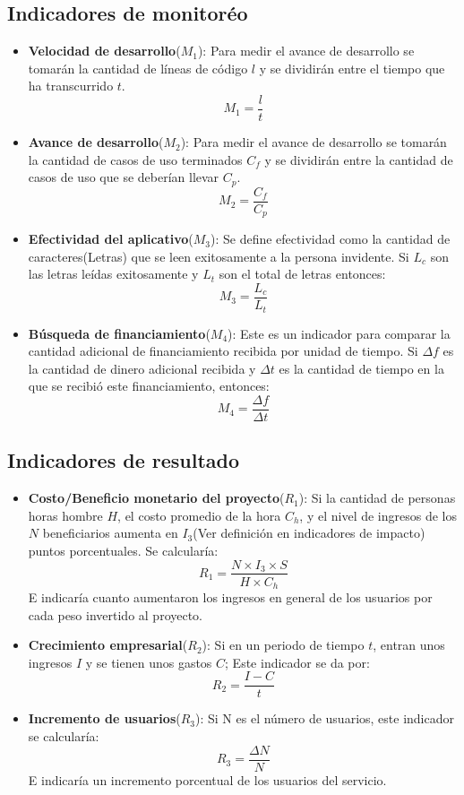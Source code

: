 \documentclass[a4paper, 12pt, oneside]{article}
\begin{document}
	\subsection{Indicadores de monitoréo}
	\begin{itemize}
		\item {\bf Velocidad de desarrollo}($M_1$): Para medir el avance de desarrollo se tomarán la cantidad
			de líneas de código $l$ y se dividirán entre el tiempo que ha transcurrido $t$.
			\[M_1 = \frac{l}{t}\]
		\item {\bf Avance de desarrollo}($M_2$): Para medir el avance de desarrollo se tomarán la cantidad
			de casos de uso terminados $C_f$ y se dividirán entre la cantidad de casos de uso que se deberían
			llevar $C_p$.
			\[M_2 = \frac{C_f}{C_p}\]
		\item {\bf Efectividad del aplicativo}($M_3$): Se define efectividad como la cantidad de caracteres(Letras)
			que se leen exitosamente a la persona invidente. Si $L_c$ son las letras leídas exitosamente y $L_t$
			son el total de letras entonces:
			\[M_3 = \frac{L_c}{L_t}\]	
		\item {\bf Búsqueda de financiamiento}($M_4$): Este es un indicador para comparar la cantidad adicional de
			financiamiento recibida por unidad de tiempo. Si $\Delta f$ es la cantidad de dinero adicional recibida
			y $\Delta t$ es la cantidad de tiempo en la que se recibió este financiamiento, entonces:
			\[M_4 = \frac{\Delta f}{\Delta t}\]
	\end{itemize}
	
	\subsection{Indicadores de resultado}
	\begin{itemize}
		\item {\bf Costo/Beneficio monetario del proyecto}($R_1$): Si la cantidad de personas horas hombre $H$,
			el costo promedio de la hora $C_h$, y el nivel de ingresos de los $N$ beneficiarios aumenta en
			$I_3$(Ver definición en indicadores de impacto) puntos porcentuales. Se calcularía:
			\[R_1 = \frac{N \times I_3 \times S}{H \times C_h}\]
			E indicaría cuanto aumentaron los ingresos en general de los usuarios por cada peso invertido
			al proyecto.
		\item {\bf Crecimiento empresarial}($R_2$): Si en un periodo de tiempo $t$, entran unos ingresos $I$ y
			se tienen unos gastos $C$; Este indicador se da por:
			\[R_2 = \frac{I-C}{t}\]
		\item {\bf Incremento de usuarios}($R_3$): Si N es el número de usuarios, este indicador se calcularía:
			\[R_3 = \frac{\Delta N}{N}\]
			E indicaría un incremento porcentual de los usuarios del servicio.
	\end{itemize}
	
\end{document}
